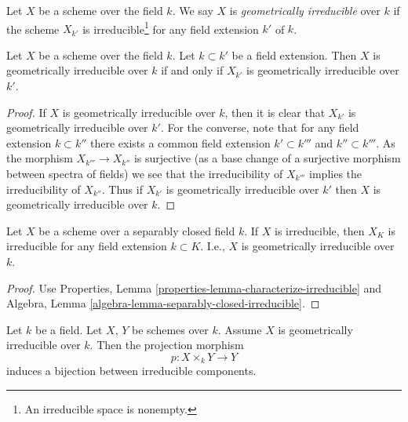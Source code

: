 \begin{definition}
\label{definition-geometrically-irreducible}
Let $X$ be a scheme over the field $k$.
We say $X$ is {\it geometrically irreducible} over $k$ if the scheme
$X_{k'}$ is irreducible\footnote{An irreducible space is nonempty.}
for any field extension $k'$ of $k$.
\end{definition}

\begin{lemma}
\label{lemma-geometrically-irreducible-check-after-extension}
Let $X$ be a scheme over the field $k$.
Let $k \subset k'$ be a field extension.
Then $X$ is geometrically irreducible over $k$ if and only if
$X_{k'}$ is geometrically irreducible over $k'$.
\end{lemma}

\begin{proof}
If $X$ is geometrically irreducible over $k$, then it is clear that
$X_{k'}$ is geometrically irreducible over $k'$. For the converse, note
that for any field extension $k \subset k''$ there exists a common
field extension $k' \subset k'''$ and $k'' \subset k'''$. As the
morphism $X_{k'''} \to X_{k''}$ is surjective (as a base change of
a surjective morphism between spectra of fields) we see that the
irreducibility of $X_{k'''}$ implies the irreducibility of $X_{k''}$.
Thus if $X_{k'}$ is geometrically irreducible over $k'$ then
$X$ is geometrically irreducible over $k$.
\end{proof}

\begin{lemma}
\label{lemma-separably-closed-irreducible}
Let $X$ be a scheme over a separably closed field $k$.
If $X$ is irreducible, then $X_K$ is irreducible for any
field extension $k \subset K$. I.e., $X$ is geometrically
irreducible over $k$.
\end{lemma}

\begin{proof}
Use Properties, Lemma \ref{properties-lemma-characterize-irreducible}
and Algebra, Lemma \ref{algebra-lemma-separably-closed-irreducible}.
\end{proof}

\begin{lemma}
\label{lemma-bijection-irreducible-components}
Let $k$ be a field.
Let $X$, $Y$ be schemes over $k$.
Assume $X$ is geometrically irreducible over $k$.
Then the projection morphism
$$
p : X \times_k Y \longrightarrow Y
$$
induces a bijection between irreducible components.
\end{lemma}

